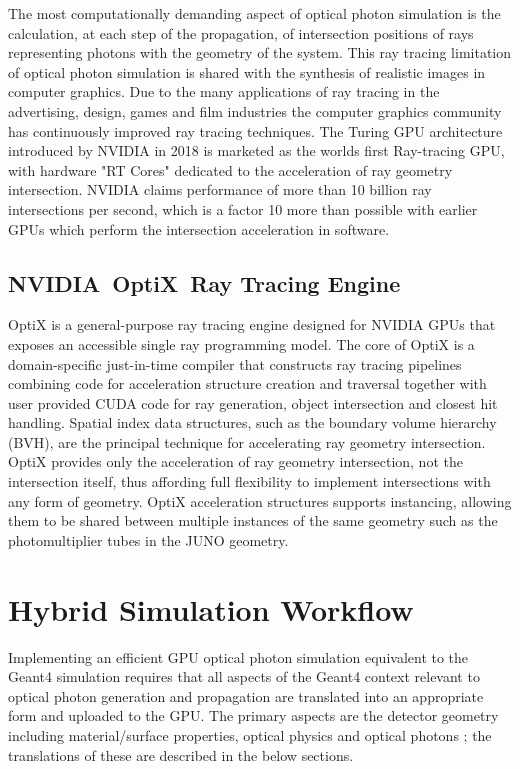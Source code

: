 \documentclass{webofc}
\begin{document}
The most computationally demanding aspect of optical photon simulation 
is the calculation, at each step of the propagation, 
of intersection positions of rays representing photons with the geometry of the system.
This ray tracing limitation of optical photon simulation is shared 
with the synthesis of realistic images in computer graphics. Due to the many applications
of ray tracing in the advertising, design, games and film industries the computer graphics
community has continuously improved ray tracing techniques. The Turing GPU architecture 
introduced by NVIDIA in 2018 is marketed as the worlds first Ray-tracing GPU, with   
hardware "RT Cores" 
dedicated to the 
acceleration of ray geometry intersection.
NVIDIA claims performance of more than 10 billion ray intersections 
per second, which is a factor 10 more than possible with earlier GPUs
which perform the intersection acceleration in software. 
%
%
\subsection{NVIDIA\textregistered\ OptiX\texttrademark\ Ray Tracing Engine}
%
OptiX is a general-purpose ray tracing engine
designed for NVIDIA GPUs that exposes an accessible single ray programming model.
The core of OptiX is a domain-specific just-in-time compiler that constructs 
ray tracing pipelines combining code for acceleration structure creation and traversal 
together with user provided CUDA code for ray generation, object intersection and closest hit handling.
Spatial index data structures, such as the boundary volume hierarchy (BVH), are the 
principal technique for accelerating ray geometry intersection.  
OptiX provides only the acceleration of ray geometry intersection, not the intersection itself,
thus affording full flexibility to implement intersections with any form of geometry. 
OptiX acceleration structures supports instancing, allowing them to be shared 
between multiple instances of the same geometry such as the photomultiplier tubes in the JUNO geometry.  
%
%

\section{Hybrid Simulation Workflow}
\label{secworkflow}
%
Implementing an efficient GPU optical photon simulation equivalent to the Geant4 simulation 
requires that all aspects of the Geant4 context relevant to optical photon generation and 
propagation are translated into an appropriate form and uploaded to the GPU. 
The primary aspects are the detector geometry including material/surface properties, optical physics and optical photons ; 
the translations of these are described in the below sections.
\end{document}
